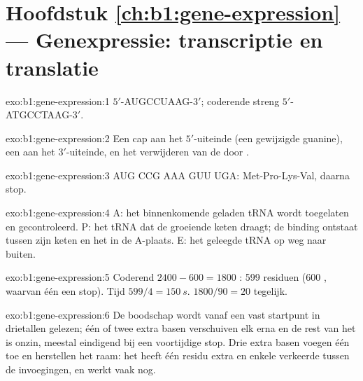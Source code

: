 \section*{Hoofdstuk \ref{ch:b1:gene-expression} --- Genexpressie: transcriptie en translatie}

\begin{solution}{exo:b1:gene-expression:1}
 $5'$-AUGCCUAAG-$3'$; coderende streng $5'$-ATGCCTAAG-$3'$.
\end{solution}

\begin{solution}{exo:b1:gene-expression:2}
Een cap aan het $5'$-uiteinde (een gewijzigde guanine), een  aan het
$3'$-uiteinde, en het verwijderen van de  door .
\end{solution}

\begin{solution}{exo:b1:gene-expression:3}
AUG CCG AAA GUU UGA: Met-Pro-Lys-Val, daarna stop.
\end{solution}

\begin{solution}{exo:b1:gene-expression:4}
A: het binnenkomende geladen tRNA wordt toegelaten en gecontroleerd. P: het tRNA
dat de groeiende keten draagt; de binding ontstaat tussen zijn keten en het
 in de A-plaats. E: het geleegde tRNA op weg naar buiten.
\end{solution}

\begin{solution}{exo:b1:gene-expression:5}
Coderend $2400 - 600 = 1800$ : 599 residuen (600 , waarvan één een
stop). Tijd $599/4 = \qty{150}{s}$.  $1800/90 = 20$ tegelijk.
\end{solution}

\begin{solution}{exo:b1:gene-expression:6}
De boodschap wordt vanaf een vast startpunt in drietallen gelezen; één of twee
extra basen verschuiven elk  erna en de rest van het  is onzin, meestal
eindigend bij een voortijdige stop. Drie extra basen voegen één  toe en
herstellen het raam: het  heeft één residu extra en enkele verkeerde tussen de
invoegingen, en werkt vaak nog.
\end{solution}

